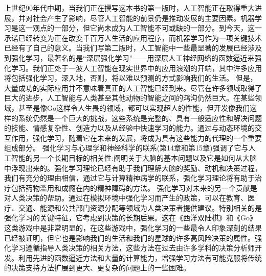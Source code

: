 上世纪90年代中期，当我们正在撰写这本书的第一版时，人工智能正在取得重大进展，并对社会产生了影响，尽管人工智能的前景仍是推动发展的主要因素。机器学习是这一观点的一部分，但它尚未成为人工智能不可或缺的一部分。到今天，这一承诺已经转变为正在改变千百万人生活的应用程序，而机器学习作为一项关键技术已经有了自己的意义。当我们写第二版时，人工智能中一些最显著的发展已经涉及到强化学习，最著名的是“深层强化学习”——用深层人工神经网络的函数逼近来强化学习。我们正处于一波人工智能在现实世界中的应用浪潮的开端，其中许多应用将包括强化学习，深入地，否则，将以难以预测的方式影响我们的生活。
但是，大量成功的实际应用并不意味着真正的人工智能已经到来。尽管在许多领域取得了巨大的进步，人工智能与人类甚至其他动物的智能之间的鸿沟仍然巨大。在某些领域，甚至是像Go这样令人生畏的领域，都可以实现超人的性能，但开发像我们这样的系统仍然是一个巨大的挑战，这些系统是完整的、具有一般适应性和解决问题的技能、情感复杂性、创造力以及从经验中快速学习的能力。通过与动态环境的交互作用，强化学习，随着它在未来的发展，将成为具有这些能力的代理的一个重要组成部分。
强化学习与心理学和神经科学的联系(第14章和第15章)强调了它与人工智能的另一个长期目标的相关性:阐明关于大脑的基本问题以及它是如何从大脑中浮现出来的。强化学习理论已经有助于我们理解大脑的奖励、动机和决策过程，我们有充分的理由相信，通过它与计算精神病学的联系，强化学习理论将有助于治疗包括药物滥用和成瘾在内的精神障碍的方法。
强化学习对未来的另一个贡献是对人类决策的帮助。通过在模拟环境中强化学习而产生的政策，可以在教育、医疗、交通、能源和公共部门资源分配等领域为人类决策者提供建议。特别相关的是强化学习的关键特征，它考虑到决策的长期后果。这在《西洋双陆棋》和《Go》这类游戏中是非常明显的，在这些游戏中，强化学习的一些最令人印象深刻的结果已经被证明，但它也是影响我们的生活和我们的星球的许多高风险决策的属性。强化学习遵循指导人类决策的相关方法，这些方法在过去由许多学科的决策分析师开发。利用先进的函数逼近方法和大量的计算能力，增强学习方法有可能克服将传统的决策支持方法扩展到更大、更复杂的问题上的一些困难。

